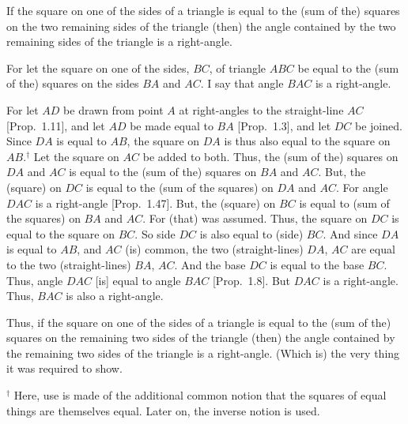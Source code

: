 \begin{Parallel}{}{}
{If the square on one of the sides of a triangle is equal to the (sum of the)
squares on the two remaining sides of the triangle (then) the angle contained
by the two remaining sides of the triangle is a right-angle.

For let the square on one of the sides, $BC$, of triangle $ABC$ be equal
to the (sum of the) squares on the sides $BA$ and $AC$. I say that angle
$BAC$ is a right-angle.

\epsfysize=1.9in
\centerline{}

For let $AD$ be drawn from point $A$ at right-angles to the
straight-line $AC$ [Prop.~1.11], and let $AD$ be made equal to
$BA$ [Prop.~1.3], and let $DC$ be joined. Since $DA$ is equal to $AB$,
the square on $DA$ is thus also equal to the square on $AB$.$^\dag$ Let the square on
$AC$ be added to both. Thus, the (sum of the) squares on $DA$ and $AC$ is equal
to the (sum of the) squares on $BA$ and $AC$. But, the (square) on $DC$ 
is equal to the (sum of the squares) on $DA$ and $AC$. For angle $DAC$ is a right-angle [Prop.~1.47].
But, the  (square) on $BC$ is equal to (sum of the squares) on $BA$ and $AC$.
For (that) was assumed. Thus, the square on $DC$ is equal to the square on $BC$.
So  side $DC$ is also equal to (side) $BC$. And since $DA$ is equal to $AB$, and $AC$ (is) common, the two (straight-lines) $DA$, $AC$ are equal to the two (straight-lines)
$BA$, $AC$. And the base $DC$ is equal to the base $BC$. Thus, angle $DAC$ [is] equal to angle $BAC$ [Prop.~1.8].  But $DAC$ is a right-angle. Thus, $BAC$ is
also a right-angle.

Thus, if the square on one of the sides of a triangle is equal to the (sum of the)
squares on the remaining two sides of the triangle (then) the angle contained
by the remaining two sides of the triangle is a right-angle. (Which is) the very thing
it was required to show.}
\end{Parallel}
{\footnotesize \noindent$^\dag$ Here, use is made of the additional common notion that the squares of equal things are
themselves equal. Later on, the inverse notion is used.} 